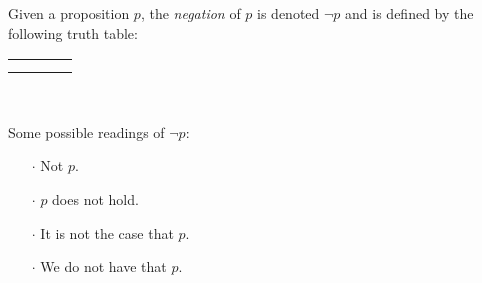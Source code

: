 \begin{definition}[Negation]
    \begin{center}
        \begin{minipage}[t]{.55\linewidth}
            Given a proposition $p$, the \emph{negation} of $p$
            is denoted $\neg p$ and is defined by the following truth table:
            \begin{table}[H]
                \centering
                \label{tab:not}
                \begin{tabular}{|Cc||Cc|}
                    \hline
                     &  \\ \hline
                    \thead{$\top$} &  \\
                    \thead{$\bot$} &  \\ \hline
                \end{tabular}
            \end{table}
        \end{minipage}%
        \begin{minipage}[t]{.05\linewidth}
            ~
        \end{minipage}%
        \begin{minipage}[t]{.4\linewidth}
            Some possible readings of $\neg p$:\\
            \begin{itemize}
                \item[$\cdot$]
                    Not $p$.
                \item[$\cdot$]
                    $p$ does not hold.
                \item[$\cdot$]
                    It is not the case that $p$.
                \item[$\cdot$]
                    We do not have that $p$.
            \end{itemize}
        \end{minipage}
    \end{center}
\end{definition}

